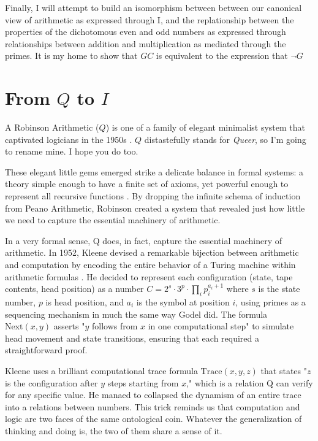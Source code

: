 \documentclass[runningheads]{llncs}
\begin{document}
Finally, I will attempt to build an isomorphism between between our canonical view of arithmetic as expressed through I, and the replationship between the properties of the dichotomous even and odd numbers as expressed through relationships between addition and multiplication as mediated through the primes. It is my home to show that $GC$ is equivalent to the expression that $\neg G$ 

\section{From $Q$ to $I$}

A Robinson Arithmetic ($Q$) is one of a family of elegant minimalist system that captivated logicians in the 1950s \cite{robinson1950undecidable}. $Q$ distastefully stands for \textit{Queer}, so I'm going to rename mine. I hope you do too. 

These elegant little gems emerged strike a delicate balance in formal systems: a theory simple enough to have a finite set of axioms, yet powerful enough to represent all recursive functions \cite{tarski1953undecidable}. By dropping the infinite schema of induction from Peano Arithmetic, Robinson created a system that revealed just how little we need to capture the essential machinery of arithmetic.

In a very formal sense, Q does, in fact, capture the essential machinery of arithmetic. In 1952, Kleene devised a remarkable bijection between arithmetic and computation by encoding the entire behavior of a Turing machine within arithmetic formulas \cite{kleene1952introduction}. He decided to represent each configuration (state, tape contents, head position) as a number $C = 2^s \cdot 3^p \cdot \prod_{i} p_i^{a_i+1}$ where $s$ is the state number, $p$ is head position, and $a_i$ is the symbol at position $i$, using primes as a sequencing mechanism in much the same way Godel did. The formula $\text{Next}(x,y)$ asserts "$y$ follows from $x$ in one computational step" to simulate head movement and state transitions, ensuring that each required a straightforward proof. 

Kleene uses a brilliant computational trace formula $\text{Trace}(x,y,z)$ that states "$z$ is the configuration after $y$ steps starting from $x$," which is a relation Q can verify for any specific value. He manaed to collapsed the dynamism of an entire trace into a relations between numbers. This trick reminds us that computation and logic are two faces of the same ontological coin. Whatever the generalization of thinking and doing is, the two of them share a sense of it.
\end{document}

